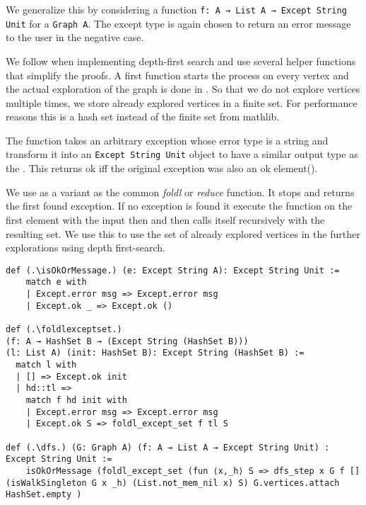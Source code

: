We generalize this by considering a function \lstinline|f: A → List A → Except String Unit| for a \lstinline|Graph A|. The except type is again chosen to return an error message to the user in the negative case.

We follow \cite{AlgorithmsBook} when implementing depth-first search and use several helper functions that simplify the proofs. A first function \dfs starts the process on every vertex and the actual exploration of the graph is done in \dfsstep. So that we do not explore vertices multiple times, we store already explored vertices in a finite set. For performance reasons this is a hash set instead of the finite set from mathlib.

The function \isOkOrMessage takes an arbitrary exception whose error type is a string and transform it into an \lstinline|Except String Unit| object to have a similar output type as the \treeValidator. This returns ok iff the original exception was also an ok element(\isOkOrMessageOkIffExceptionIsOk).

We use \foldlexceptset as a variant as the common \textit{foldl} or \textit{reduce} function. It stops and returns the first found exception. If no exception is found it execute the function on the first element with the input then and then calls itself recursively with the resulting set. We use this to use the set of already explored vertices in the further explorations using depth first-search.

\begin{lstlisting}
def (.\isOkOrMessage.) (e: Except String A): Except String Unit :=
    match e with
    | Except.error msg => Except.error msg
    | Except.ok _ => Except.ok ()

def (.\foldlexceptset.) 
(f: A → HashSet B → (Except String (HashSet B))) 
(l: List A) (init: HashSet B): Except String (HashSet B) :=
  match l with
  | [] => Except.ok init
  | hd::tl =>
    match f hd init with
    | Except.error msg => Except.error msg
    | Except.ok S => foldl_except_set f tl S

def (.\dfs.) (G: Graph A) (f: A → List A → Except String Unit) : Except String Unit :=
    isOkOrMessage (foldl_except_set (fun ⟨x,_h⟩ S => dfs_step x G f [] (isWalkSingleton G x _h) (List.not_mem_nil x) S) G.vertices.attach HashSet.empty )
\end{lstlisting}

